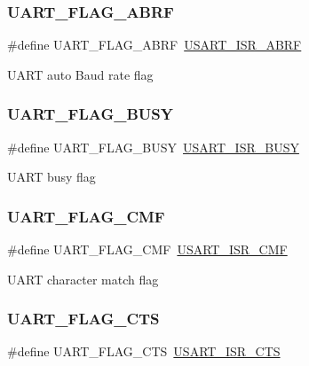 \subsubsection{\texorpdfstring{UART\_FLAG\_ABRF}{UART\_FLAG\_ABRF}}
{\footnotesize\ttfamily \#define U\+A\+R\+T\+\_\+\+F\+L\+A\+G\+\_\+\+A\+B\+RF~\mbox{\hyperlink{group___peripheral___registers___bits___definition_gafbbfac6c1ba908d265572184b02daed2}{U\+S\+A\+R\+T\+\_\+\+I\+S\+R\+\_\+\+A\+B\+RF}}}

U\+A\+RT auto Baud rate flag \mbox{\label{group___u_a_r_t___flags_ga2d1387d412382a345097acb403748ba3}} 
\subsubsection{\texorpdfstring{UART\_FLAG\_BUSY}{UART\_FLAG\_BUSY}}
{\footnotesize\ttfamily \#define U\+A\+R\+T\+\_\+\+F\+L\+A\+G\+\_\+\+B\+U\+SY~\mbox{\hyperlink{group___peripheral___registers___bits___definition_gafb7fb858e7f0dec99740570ecfb922cc}{U\+S\+A\+R\+T\+\_\+\+I\+S\+R\+\_\+\+B\+U\+SY}}}

U\+A\+RT busy flag \mbox{\label{group___u_a_r_t___flags_ga01f2c67d8999a9ee8d91ac3cb5e7fbfe}} 
\subsubsection{\texorpdfstring{UART\_FLAG\_CMF}{UART\_FLAG\_CMF}}
{\footnotesize\ttfamily \#define U\+A\+R\+T\+\_\+\+F\+L\+A\+G\+\_\+\+C\+MF~\mbox{\hyperlink{group___peripheral___registers___bits___definition_ga8199e4dab14311318c87b77ef758c2f9}{U\+S\+A\+R\+T\+\_\+\+I\+S\+R\+\_\+\+C\+MF}}}

U\+A\+RT character match flag \mbox{\label{group___u_a_r_t___flags_ga5435edd22ff23de7187654362c48e0b1}} 
\subsubsection{\texorpdfstring{UART\_FLAG\_CTS}{UART\_FLAG\_CTS}}
{\footnotesize\ttfamily \#define U\+A\+R\+T\+\_\+\+F\+L\+A\+G\+\_\+\+C\+TS~\mbox{\hyperlink{group___peripheral___registers___bits___definition_ga89131b07184422c83fda07ca20d4ce4c}{U\+S\+A\+R\+T\+\_\+\+I\+S\+R\+\_\+\+C\+TS}}}

